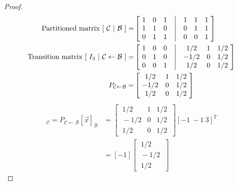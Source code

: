 \documentclass[../main.tex]{subfiles}
\begin{document}
\begin{proof}
        \begin{align*}
                \textrm{Partitioned matrix } [\ \mathcal{C}\ |\ \mathcal{B}\ ] =
                 & \begin{bmatrix}
                        \ 1 & 0 & 1 & \bigm| & 1 & 1 & 1 \ \\
                        \ 1 & 1 & 0 & \bigm| & 0 & 1 & 1 \ \\
                        \ 0 & 1 & 1 & \bigm| & 0 & 0 & 1 \
                \end{bmatrix} \\
                \textrm{Transition matrix } [\ I_3 \ |\ {\mathcal{C} \leftarrow \mathcal{B}}\ ] =
                 & \begin{bmatrix}
                        \ 1 & 0 & 0 & \bigm| & {1}/{2}  & 1 & {1}/{2} \ \\
                        \ 0 & 1 & 0 & \bigm| & -{1}/{2} & 0 & {1}/{2} \ \\
                        \ 0 & 0 & 1 & \bigm| & {1}/{2}  & 0 & {1}/{2} \
                \end{bmatrix} \\
                P_{\mathcal{C} \leftarrow \mathcal{B}} =
                 & \begin{bmatrix}
                        \ {1}/{2}  & 1 & {1}/{2} \ \\
                        \ -{1}/{2} & 0 & {1}/{2} \ \\
                        \ {1}/{2}  & 0 & {1}/{2} \
                \end{bmatrix}
        \end{align*}
        \begin{align*}
                [\vec{x}]_\mathcal{C} = P_{\mathcal{C} \leftarrow \mathcal{B}}[\vec{x}]_{\mathcal{B}}
                 & = \begin{bmatrix}
                        \ {1}/{2}  & 1 & {1}/{2} \ \\
                        \ -{1}/{2} & 0 & {1}/{2} \ \\
                        \ {1}/{2}  & 0 & {1}/{2} \
                \end{bmatrix}[-1 \ -1 \ 3]^T \\
                 & = [-1]\begin{bmatrix}
                        \ {1}/{2} \ \\
                        \ -{1}/{2}\ \\
                        \ {1}/{2} \

\end{bmatrix}
\end{align*}
\end{proof}
\end{document}
